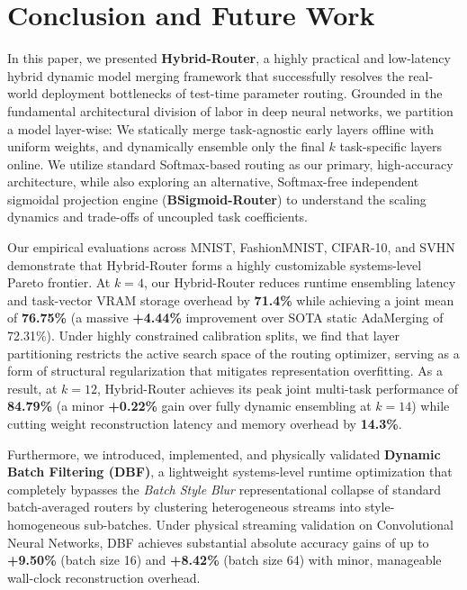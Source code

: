 \section{Conclusion and Future Work}
\label{sec:conclusion}

In this paper, we presented \textbf{Hybrid-Router}, a highly practical and low-latency hybrid dynamic model merging framework that successfully resolves the real-world deployment bottlenecks of test-time parameter routing. Grounded in the fundamental architectural division of labor in deep neural networks, we partition a model layer-wise: We statically merge task-agnostic early layers offline with uniform weights, and dynamically ensemble only the final $k$ task-specific layers online. We utilize standard Softmax-based routing as our primary, high-accuracy architecture, while also exploring an alternative, Softmax-free independent sigmoidal projection engine (\textbf{BSigmoid-Router}) to understand the scaling dynamics and trade-offs of uncoupled task coefficients.

Our empirical evaluations across MNIST, FashionMNIST, CIFAR-10, and SVHN demonstrate that Hybrid-Router forms a highly customizable systems-level Pareto frontier. At $k=4$, our Hybrid-Router reduces runtime ensembling latency and task-vector VRAM storage overhead by \textbf{71.4\%} while achieving a joint mean of \textbf{76.75\%} (a massive \textbf{+4.44\%} improvement over SOTA static AdaMerging of 72.31\%). Under highly constrained calibration splits, we find that layer partitioning restricts the active search space of the routing optimizer, serving as a form of structural regularization that mitigates representation overfitting. As a result, at $k=12$, Hybrid-Router achieves its peak joint multi-task performance of \textbf{84.79\%} (a minor \textbf{+0.22\%} gain over fully dynamic ensembling at $k=14$) while cutting weight reconstruction latency and memory overhead by \textbf{14.3\%}. 

Furthermore, we introduced, implemented, and physically validated \textbf{Dynamic Batch Filtering (DBF)}, a lightweight systems-level runtime optimization that completely bypasses the \emph{Batch Style Blur} representational collapse of standard batch-averaged routers by clustering heterogeneous streams into style-homogeneous sub-batches. Under physical streaming validation on Convolutional Neural Networks, DBF achieves substantial absolute accuracy gains of up to \textbf{+9.50\%} (batch size 16) and \textbf{+8.42\%} (batch size 64) with minor, manageable wall-clock reconstruction overhead.

